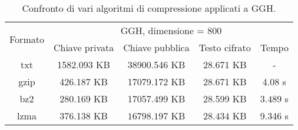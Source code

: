 \begin{table}[H]
    \centering
    \begin{tabular}{|c|c|c|c|c|}
    \hline
    \multirow{2}{*}{Formato} & \multicolumn{4}{c|}{GGH, dimensione = 800} \\ \cline{2-5} 
     & Chiave privata & Chiave pubblica & Testo cifrato & Tempo \\ \hline
    txt & 1582.093 KB& 38900.546 KB& 28.671 KB& -\\ \hline
    gzip & 426.187 KB& 17079.172 KB& 28.671 KB& 4.08 s\\ \hline
    bz2 & $\mathbf{280.169}$ KB& 17057.499 KB& 28.599 KB& $\mathbf{3.489}$ s\\ \hline
    lzma & 376.138 KB& $\mathbf{16798.197}$ KB& $\mathbf{28.434}$ KB& 9.346 s\\ \hline
    \end{tabular}
    \caption{Confronto di vari algoritmi di compressione applicati a GGH.}
    \label{tab:GGH_differenze}
\end{table}


